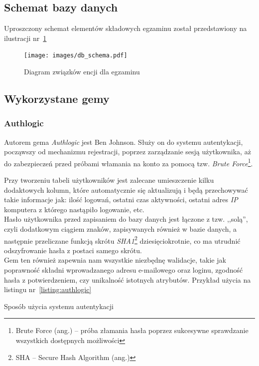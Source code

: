 \documentclass[a4paper,12pt]{article}
\begin{document}
\subsection{Schemat bazy danych}
Uproszczony schemat elementów składowych egzaminu został przedstawiony na ilustracji
nr~\ref{fig:db_schema}

\begin{figure}[ht]
  \begin{center}
    \texttt{[image: images/db\_schema.pdf]}
  \end{center}
  \caption{Diagram związków encji dla egzaminu}
  \label{fig:db_schema}
\end{figure}

\subsection{Wykorzystane gemy}
\subsubsection{Authlogic}\label{sec:authlogic}
Autorem gema \emph{Authlogic} jest Ben Johnson. Służy on do systemu autentykacji,
począwszy od mechanizmu rejestracji, poprzez zarządzanie sesją użytkownika, aż do
zabezpieczeń przed próbami włamania na konto za pomocą tzw. \emph{Brute
Force}\footnote{Brute Force (ang.) -- próba złamania hasła poprzez sukcesywne sprawdzanie
wszystkich dostępnych możliwości}.


Przy tworzeniu tabeli użytkowników jest zalecane umieszczenie kilku dodaktowych kolumn,
które automatycznie się aktualizują i będą przechowywać takie informacje jak: ilość
logowań, ostatni czas aktywności, ostatni adres \emph{IP} komputera z którego nastąpiło
logowanie, etc.\\
Hasło użytkownika przed zapisaniem do bazy danych jest łączone z tzw. ,,solą'', czyli
dodatkowym ciągiem znaków, zapisywanych również w bazie danych, a następnie przeliczane
funkcją skrótu \emph{SHA1}\footnote{SHA -- Secure Hash Algorithm (ang.)}
dziesięciokrotnie, co ma utrudnić odszyfrowanie hasła z postaci samego skrótu.\\
Gem ten również zapewnia nam wszystkie niezbędnę walidacje, takie jak poprawność składni
wprowadzanego adresu e-mailowego oraz loginu, zgodność hasła z potwierdzeniem, czy
unikalność istotnych atrybutów. Przykład użycia na listingu nr~\ref{listing:authlogic}

\begin{listing}
  
  \caption{Sposób użycia systemu autentykacji}
  \label{listing:authlogic}
\end{listing}
\end{document}
